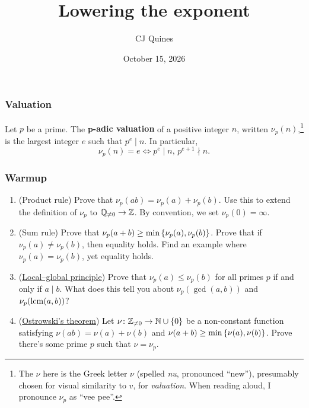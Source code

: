 \documentclass[11pt,paper=letter]{scrartcl}
\begin{document}
\title{Lowering the exponent}
\author{CJ Quines}
\date{October 15, 2026}

\maketitle

\subsubsection*{Valuation}

Let $p$ be a prime. The \textbf{$\boldsymbol{p}$-adic valuation} of a positive integer $n$, written $\nu_p(n)$,\footnote{
  The $\nu$ here is the Greek letter $\nu$ (spelled \textit{nu}, pronounced ``new''), presumably chosen for visual similarity to $v$, for \textit{valuation}. When reading aloud, I pronounce $\nu_p$ as ``vee pee''.
} is the largest integer $e$ such that $p^e \mid n$.
In particular, \[
  \nu_p(n) = e \iff p^e \mid n,\,p^{e+1}\nmid n.
\]

\subsubsection*{Warmup}

\begin{enumerate}

\item (Product rule) Prove that $\nu_p(ab) = \nu_p(a) + \nu_p(b)$. Use this to extend the definition of $\nu_p$ to $\mathbb Q_{\ne 0} \to \mathbb Z$. By convention, we set $\nu_p(0) = \infty$.

\item (Sum rule) Prove that $\nu_p(a + b) \ge \min\left\{ \nu_p(a), \nu_p(b) \right\}$. Prove that if $\nu_p(a) \ne \nu_p(b)$, then equality holds. Find an example where $\nu_p(a) = \nu_p(b)$, yet equality holds.

\item (\href{https://en.wikipedia.org/wiki/Hasse_principle}{Local--global principle}) Prove that $\nu_p(a) \le \nu_p(b)$ for all primes $p$ if and only if $a \mid b$. What does this tell you about $\nu_p(\gcd(a, b))$ and $\nu_p(\operatorname*{lcm}(a, b))$?

\item (\href{https://en.wikipedia.org/wiki/Ostrowski's_theorem}{Ostrowski's theorem}) Let $\nu \colon \mathbb Z_{\ne 0} \to \mathbb N \cup \{0\}$ be a non-constant function satisfying $\nu(ab) = \nu(a) + \nu(b)$ and $\nu(a + b) \ge \min\left\{ \nu(a), \nu(b) \right\}$. Prove there's some prime $p$ such that $\nu = \nu_p$.

\end{enumerate}
\end{document}
